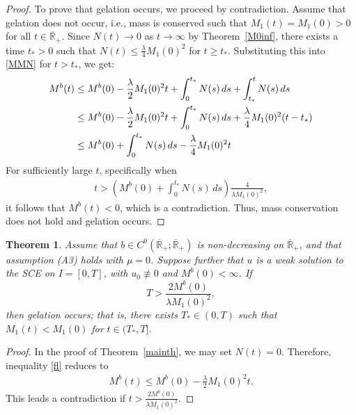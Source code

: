 \documentclass[a4paper,11pt]{article}
\newtheorem{thm}{Theorem}[section]
\def\Rb{\overline{{\mathbb R}}_+}
\begin{document}
\begin{proof}
To prove that gelation occurs, we proceed by contradiction. 
Assume that gelation does not occur, i.e., mass is conserved such that $M_1(t)=M_1(0)>0$ for all $t\in\Rb$.
Since $N(t)\to 0$ as $t\to\infty$ by Theorem~\ref{M0inf}, there exists a time $t_*>0$ such that
$N(t)\le \frac{\lambda}{4}M_1(0)^2$ for $t\ge t_*$.
Substituting this into \eqref{MMN} for $t>t_*$, we get:
\begin{align}
M^b(t)&\le M^b(0)-\frac{\lambda}{2}M_1(0)^2t
+\int_0^{t_*}N(s)\,ds+\int_{t_*}^tN(s)\,ds\label{fl}\\
&\le
M^b(0)-\frac{\lambda}{2}M_1(0)^2t
+\int_0^{t_*}N(s)\,ds
+\frac{\lambda}{4}M_1(0)^2(t-t_*)\notag\\
&\le
M^b(0)
+\int_0^{t_*}N(s)\,ds
-\frac{\lambda}{4}M_1(0)^2t\notag
\end{align}
For sufficiently large $t$, specifically when
\begin{align*}
t> \left(M^b(0)
+\int_0^{t_*}N(s)\,ds\right)\frac{4}{\lambda M_1(0)^2}, 
\end{align*}
it follows that $M^b(t)<0$,
which is a contradiction. Thus, mass conservation
does not hold and gelation occurs.
\end{proof}

\begin{thm}\label{mainth-2}
Assume that $b\in C^0(\Rb;\Rb)$ is non-decreasing on $\Rb$, and that assumption (A3) holds with $\mu=0$. Suppose further that $u$ is a weak solution to the SCE on $I=[0,T]$, with $u_0\not\equiv 0$ and $M^b(0)<\infty$.
If
\[
T > \frac{2 M^b(0)}{\lambda M_1(0)^2},
\]
then gelation occurs; that is, there exists $T_*\in (0,T)$ such that $M_1(t)<M_1(0)$ for $t\in (T_*,T]$. 
\end{thm}
\begin{proof}
In the proof of Theorem~\ref{mainth}, we may set $N(t)=0$. Therefore, inequality \eqref{fl} reduces to
\begin{align*}
M^b(t)\le M^b(0)-\frac{\lambda}{2}M_1(0)^2t.
\end{align*}
This leads a contradiction if $t>\frac{2 M^b(0)}{\lambda M_1(0)^2}$.
\end{proof}
\end{document}
